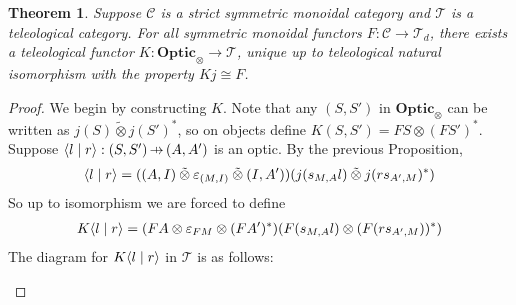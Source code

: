 \documentclass[11pt,a4paper]{article}
\theoremstyle{plain}
\newtheorem{theorem}{Theorem}[subsection]
\theoremstyle{definition}
\newcommand{\C}{\mathscr{C}}
\newcommand{\T}{\mathscr{T}}
\newcommand{\Optic}{\mathbf{Optic}}
\newcommand{\switched}{\mathbin{\tilde{\otimes}}}
\newcommand{\rep}[2]{{\ensuremath \left\langle #1 \mid #2 \right\rangle}}
\newcommand{\hto}{\ensuremath{\,\mathaccent\shortmid\rightarrow\,}}
\begin{document}
\begin{theorem}
  \label{optic-is-free-teleological-cat}
  Suppose $\C$ is a strict symmetric monoidal category and $\T$ is a teleological category. For all symmetric monoidal functors $F : \C \to \T_d$, there exists a teleological functor $K : \Optic_\otimes \to \T$, unique up to teleological natural isomorphism with the property $Kj \cong F$.
\end{theorem}
\begin{proof}
  We begin by constructing $K$. Note that any $(S, S')$ in $\Optic_\otimes$ can be written as $j(S) \switched j(S')^*$, so on objects define $K(S, S') = FS \otimes (FS')^*$. Suppose $\rep{l}{r} : (S, S') \hto (A, A')$ is an optic. By the previous Proposition,
  \begin{align*}
    \rep{l}{r} = ((A, I) \switched \varepsilon_{(M, I)} \switched (I, A'))(j(s_{M,A}l) \switched j(rs_{A', M})^*)
  \end{align*}
  So up to isomorphism we are forced to define
  \begin{align*}
    K\rep{l}{r} = (FA \otimes \varepsilon_{FM} \otimes (FA')^*)(F(s_{M,A}l) \otimes (F(rs_{A', M}))^* )
  \end{align*}
  The diagram for $K\rep{l}{r}$ in $\T$ is as follows:
  \begin{center}
    
  \end{center}
  


\end{proof}
\end{document}
